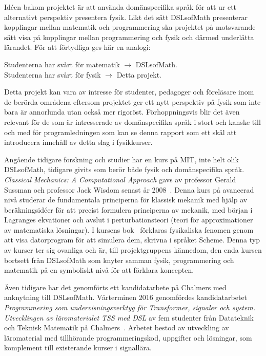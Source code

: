 Idéen bakom projektet är att använda domänspecifika språk för att ur ett alternativt perspektiv presentera fysik. Likt det sätt DSLsofMath
presenterar kopplingar mellan matematik och programmering ska projektet på motsvarande sätt visa på kopplingar mellan programmering och fysik och därmed
underlätta lärandet. För att förtydliga ges här en analogi:


\begin{center}
Studenterna har svårt för matematik $\rightarrow $ DSLsofMath.\\
Studenterna har svårt för fysik $\rightarrow $ Detta projekt.
\end{center}

Detta projekt kan vara av intresse för studenter, pedagoger och
föreläsare inom de berörda områdena eftersom projektet ger ett nytt
perspektiv på fysik som inte bara är annorlunda utan också mer rigoröst.
Förhoppningsvis blir det även relevant för de som är intresserade av
domänspecifika språk i stort och kanske till och med för programledningen som
kan se denna rapport som ett skäl att introducera innehåll av detta slag i
fysikkurser.

Angående tidigare forskning och studier har en kurs på MIT, inte helt olik
DSLsofMath, tidigare givits som berör både fysik och
domänspecifika språk.
\textit{Classical Mechanics: A Computational Approach} gavs av professor Gerald Sussman
och professor Jack Wisdom senast år 2008~\cite{classical-mechanics-course-mit-2008}.
Denna kurs på avancerad nivå studerar de fundamentala principerna för klassisk
mekanik med hjälp av beräkningsidéer för att precist formulera principerna av
mekanik, med början i Lagranges ekvationer och avslut i perturbationsteori
(teori för approximationer av matematiska lösningar). I kursens bok~\cite{SICM}
förklaras fysikaliska fenomen genom att visa datorprogram för att simulera dem,
skrivna i språket Scheme. Denna typ av kurser ter sig ovanliga och är, till
projektgruppens kännedom, den enda kursen bortsett från DSLsofMath  som knyter
samman fysik, programmering och matematik på en symboliskt nivå för att förklara
koncepten.

Även tidigare har det genomförts ett kandidatarbete på Chalmers med anknytning till DSLsofMath.
Vårterminen 2016 genomfördes kandidatarbetet \textit{Programmering som
undervisningsverktyg för Transformer, signaler och system. Utvecklingen av
läromaterialet TSS med DSL} av fem studenter från Datateknik och Teknisk
Matematik på Chalmers~\cite{kandidat2016}. Arbetet bestod av utveckling av läromaterial med
tillhörande programmeringskod, uppgifter och lösningar, som komplement till
existerande kurser i signallära.

